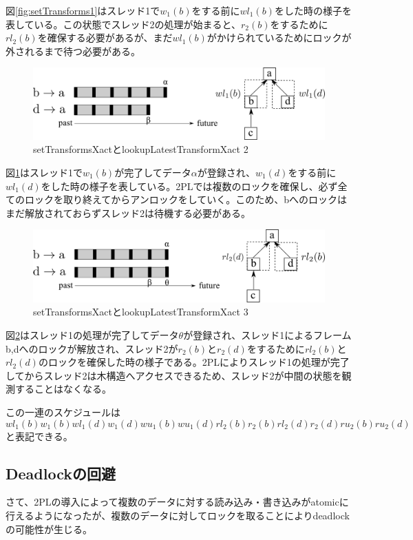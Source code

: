 \documentclass[a4paper]{jreport}	%
\begin{document}
図\ref{fig:setTransforms1}はスレッド1で$w_1(b)$をする前に$wl_1(b)$をした時の様子を表している。この状態でスレッド2の処理が始まると、$r_2(b)$をするために$rl_2(b)$を確保する必要があるが、まだ$wl_1(b)$がかけられているためにロックが外されるまで待つ必要がある。

\begin{figure}[h] 
\centering
\includegraphics[width=12cm]{setTransforms2}
\caption{setTransformsXactとlookupLatestTransformXact 2}
\label{fig:setTransforms2}
\end{figure}

図\ref{fig:setTransforms2}はスレッド1で$w_1(b)$が完了してデータ$\alpha$が登録され、$w_1(d)$をする前に$wl_1(d)$をした時の様子を表している。2PLでは複数のロックを確保し、必ず全てのロックを取り終えてからアンロックをしていく。このため、bへのロックはまだ解放されておらずスレッド2は待機する必要がある。


\begin{figure}[h] 
\centering
\includegraphics[width=12cm]{setTransforms3}
\caption{setTransformsXactとlookupLatestTransformXact 3}
\label{fig:setTransforms3}
\end{figure}


図\ref{fig:setTransforms3}はスレッド1の処理が完了してデータ$\theta$が登録され、スレッド1によるフレームb,dへのロックが解放され、スレッド2が$r_2(b)$と$r_2(d)$をするために$rl_2(b)$と$rl_2(d)$のロックを確保した時の様子である。2PLによりスレッド1の処理が完了してからスレッド2は木構造へアクセスできるため、スレッド2が中間の状態を観測することはなくなる。

この一連のスケジュールは
\begin{equation}
	wl_1(b)w_1(b)wl_1(d)w_1(d)wu_1(b)wu_1(d)rl_2(b)r_2(b)rl_2(d)r_2(d)ru_2(b)ru_2(d)
\end{equation}
と表記できる。

\subsection{Deadlockの回避}
さて、2PLの導入によって複数のデータに対する読み込み・書き込みがatomicに行えるようになったが、複数のデータに対してロックを取ることによりdeadlockの可能性が生じる。
\end{document}
